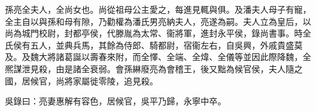 
\begin{pinyinscope}
孫亮全夫人，全尚女也。尚從祖母公主愛之，每進見輒與俱。及潘夫人母子有寵，全主自以與孫和母有隙，乃勸權為潘氏男亮納夫人，亮遂為嗣。夫人立為皇后，以尚為城門校尉，封都亭侯，代滕胤為太常、衞將軍，進封永平侯，錄尚書事。時全氏侯有五人，並典兵馬，其餘為侍郎、騎都尉，宿衞左右，自吳興，外戚貴盛莫及。及魏大將諸葛誕以壽春來附，而全懌、全端、全煒、全儀等並因此際降魏，全熈謀泄見殺，由是諸全衰弱。會孫綝廢亮為會稽王，後又黜為候官侯，夫人隨之國，居候官，尚將家屬徙零陵，追見殺。

吳錄曰：亮妻惠解有容色，居候官，吳平乃歸，永寧中卒。


\end{pinyinscope}